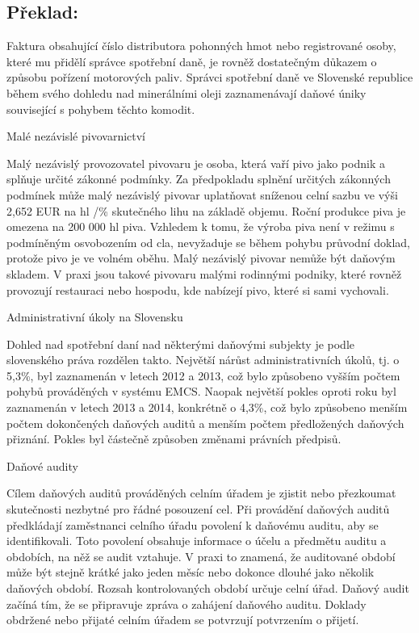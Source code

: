 \documentclass[10pt]{article}
\begin{document}
\pagebreak

\subsection*{Překlad:}

Faktura obsahující číslo distributora pohonných hmot nebo registrované osoby, které mu přidělí správce spotřební daně, je rovněž dostatečným důkazem o způsobu pořízení motorových paliv.
Správci spotřební daně ve Slovenské republice během svého dohledu nad minerálními oleji zaznamenávají daňové úniky související s pohybem těchto komodit.


Malé nezávislé pivovarnictví

Malý nezávislý provozovatel pivovaru je osoba, která vaří pivo jako podnik a splňuje určité zákonné podmínky.
Za předpokladu splnění určitých zákonných podmínek může malý nezávislý pivovar uplatňovat sníženou celní sazbu ve výši 2,652 EUR na hl /\% skutečného lihu na základě objemu.
Roční produkce piva je omezena na 200 000 hl piva.
Vzhledem k tomu, že výroba piva není v režimu s podmíněným osvobozením od cla, nevyžaduje se během pohybu průvodní doklad, protože pivo je ve volném oběhu.
Malý nezávislý pivovar nemůže být daňovým skladem.
V praxi jsou takové pivovaru malými rodinnými podniky, které rovněž provozují restauraci nebo hospodu, kde nabízejí pivo, které si sami vychovali.


Administrativní úkoly na Slovensku

Dohled nad spotřební daní nad některými daňovými subjekty je podle slovenského práva rozdělen takto.
Největší nárůst administrativních úkolů, tj. o 5,3\%, byl zaznamenán v letech 2012 a 2013, což bylo způsobeno vyšším počtem pohybů prováděných v systému EMCS.
Naopak největší pokles oproti roku byl zaznamenán v letech 2013 a 2014, konkrétně o 4,3\%, což bylo způsobeno menším počtem dokončených daňových auditů a menším počtem předložených daňových přiznání.
Pokles byl částečně způsoben změnami právních předpisů.


Daňové audity

Cílem daňových auditů prováděných celním úřadem je zjistit nebo přezkoumat skutečnosti nezbytné pro řádné posouzení cel.
Při provádění daňových auditů předkládají zaměstnanci celního úřadu povolení k daňovému auditu, aby se identifikovali. Toto povolení obsahuje informace o účelu a předmětu auditu a obdobích, na něž se audit vztahuje.
V praxi to znamená, že auditované období může být stejně krátké jako jeden měsíc nebo dokonce dlouhé jako několik daňových období.
Rozsah kontrolovaných období určuje celní úřad.
Daňový audit začíná tím, že se připravuje zpráva o zahájení daňového auditu.
Doklady obdržené nebo přijaté celním úřadem se potvrzují potvrzením o přijetí.
\end{document}
